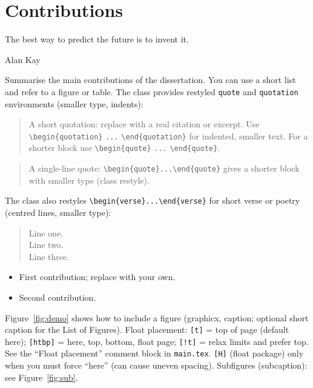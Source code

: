 
\section{Contributions}\label{sec:contributions}

\epigraph{The best way to predict the future is to invent it.}{Alan Kay}

Summarise the main contributions of the dissertation. You can use a short list and refer to a figure or table. The class provides restyled \texttt{quote} and \texttt{quotation} environments (smaller type, indents):

\begin{quotation}
  A short quotation: replace with a real citation or excerpt. Use \verb|\begin{quotation}| \verb|...| \verb|\end{quotation}| for indented, smaller text. For a shorter block use \verb|\begin{quote}| \verb|...| \verb|\end{quote}|.
\end{quotation}

\begin{quote}
  A single-line quote: \verb|\begin{quote}...\end{quote}| gives a shorter block with smaller type (class restyle).
\end{quote}

The class also restyles \verb|\begin{verse}...\end{verse}| for short verse or poetry (centred lines, smaller type):
\begin{verse}
  Line one.\\
  Line two.\\
  Line three.
\end{verse}

\begin{itemize}
  \item First contribution; replace with your own.
  \item Second contribution.
\end{itemize}

Figure~\ref{fig:demo} shows how to include a figure (graphicx, caption; optional short caption for the List of Figures). Float placement: \texttt{[t]} = top of page (default here); \texttt{[htbp]} = here, top, bottom, float page; \texttt{[!t]} = relax limits and prefer top. See the ``Float placement'' comment block in \texttt{main.tex}. \texttt{[H]} (float package) only when you must force ``here'' (can cause uneven spacing). Subfigures (subcaption): see Figure~\ref{fig:sub}.

